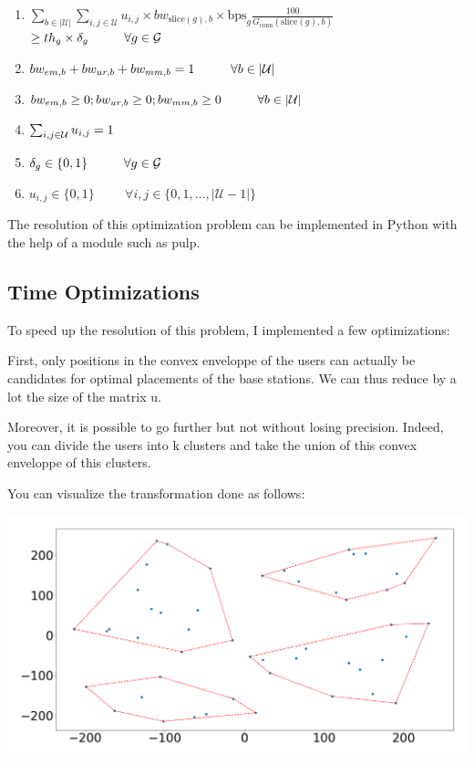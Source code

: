 \documentclass[letterpaper]{article}
\begin{document}
\begin{multicols}{2}
\begin{enumerate}
    \item $\sum_{b \in |\mathcal{U}|} \sum_{i, j \in \mathcal{U}} u_{i, j} \times bw_{\text{slice}(g), b} \times \text{bps}_g \frac{100}{G_{\text{conn}}(\text{slice}(g),b)} \nonumber$
    $\geq th_g \times \delta_g \hspace{1cm} \forall g \in \mathcal{G} \\[1em]$
    \item $bw_{em,b} + bw_{ur,b} + bw_{mm,b} = 1 \hspace{1cm} \forall b \in |\mathcal{U}| \\[1em]$
    \item $bw_{em,b} \geq 0; bw_{ur,b} \geq 0; bw_{mm,b} \geq 0 \hspace{1cm} \forall b \in |\mathcal{U}| \\[1em]$
    \item $\sum_{i,j \in \mathcal{U}}u_{i,j} = 1 \\[1em]$
    \item $\delta_g \in \{0, 1\} \hspace{1cm} \forall g \in \mathcal{G} \\[1em] $
    \item $u_{i,j} \in \{0, 1\} \hspace{1cm} \forall i,j \in \{0, 1, \ldots , |\mathcal{U}-1|\}$
\end{enumerate}

The resolution of this optimization problem can be implemented in Python with the help of a module such as pulp.

\subsection{Time Optimizations}

To speed up the resolution of this problem, I implemented a few optimizations:

First, only positions in the convex enveloppe of the users can actually be candidates for optimal placements of the base stations.
We can thus reduce by a lot the size of the matrix u.

Moreover, it is possible to go further but not without losing precision.
Indeed, you can divide the users into k clusters and take the union of this convex enveloppe of this clusters.

You can visualize the transformation done as follows:

\includegraphics[scale=0.15]{images/four_cluster.png}


\end{multicols}
\end{document}
